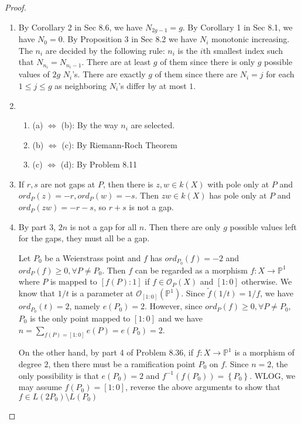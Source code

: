 \documentclass{solution}
\begin{document}
\begin{proof}
    \begin{enumerate}
        \item By Corollary 2 in Sec 8.6, we have $N_{2g - 1} = g$. By Corollary 1 in Sec 8.1, we have $N_0 = 0$. By Proposition 3 in Sec 8.2 we have $N_i$ monotonic increasing. The $n_i$ are decided by the following rule: $n_i$ is the $i$th smallest index such that $N_{n_i} = N_{n_i - 1}$. There are at least $g$ of them since there is only $g$ possible values of $2g$ $N_i$'s. There are exactly $g$ of them since there are $N_i = j$ for each $1 \le j \le g$ as neighboring $N_i$'s differ by at most $1$.
        \item
        \begin{enumerate}
            \item (a) $\Leftrightarrow$ (b): By the way $n_i$ are selected.
            \item (b) $\Leftrightarrow$ (c): By Riemann-Roch Theorem
            \item (c) $\Leftrightarrow$ (d): By Problem 8.11
        \end{enumerate}
        \item If $r, s$ are not gaps at $P$, then there is $z, w \in k(X)$ with pole only at $P$ and $ord_P(z) = -r, ord_P(w) = -s$. Then $zw \in k(X)$ has pole only at $P$ and $ord_P(zw) = -r - s$, so $r + s$ is not a gap.
        \item By part 3, $2n$ is not a gap for all $n$. Then there are only $g$ possible values left for the gaps, they must all be a gap.
        
        Let $P_0$ be a Weierstrass point and $f$ has $ord_{P_0}(f) = -2$ and $ord_P(f) \ge 0, \forall P \ne P_0$. Then $f$ can be regarded as a morphism $f: X \rightarrow \mathbb{P}^1$ where $P$ is mapped to $[f(P):1]$ if $f \in \mathcal{O}_{P}(X)$ and $[1:0]$ otherwise. We know that $1 / t$ is a parameter at $\mathcal{O}_{[1:0]}(\mathbb{P}^1)$. Since $\tilde{f}(1/t) = 1 / f$, we have $ord_{P_0}(t) = 2$, namely $e(P_0) = 2$. However, since $ord_P(f) \ge 0, \forall P \ne P_0$, $P_0$ is the only point mapped to $[1:0]$ and we have $n = \sum\limits_{f(P) = [1:0]} e(P) = e(P_0) = 2$.

        On the other hand, by part 4 of Problem 8.36, if $f: X \rightarrow \mathbb{P}^1$ is a morphism of degree $2$, then there must be a ramification point $P_0$ on $f$. Since $n = 2$, the only possibility is that $e(P_0) = 2$ and $f ^{-1} (f(P_0)) = \left\lbrace P_0 \right\rbrace$. WLOG, we may assume $f(P_0) = [1:0]$, reverse the above arguments to show that $f \in L(2P_0) \setminus L(P_0)$


\end{enumerate}
\end{proof}
\end{document}
